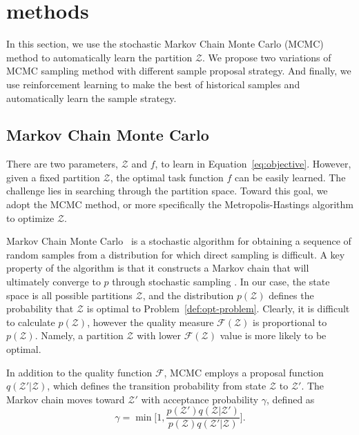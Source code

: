 \section{methods}
\label{sec:method}

In this section, we use the stochastic Markov Chain Monte Carlo (MCMC) method to automatically learn the partition $\mathcal{Z}$. We propose two variations of MCMC sampling method with different sample proposal strategy. And finally, we use reinforcement learning to make the best of historical samples and automatically learn the sample strategy.


\subsection{Markov Chain Monte Carlo}

There are two parameters, $\mathcal{Z}$ and $f$, to learn in Equation~\ref{eq:objective}. However, given a fixed partition $\mathcal{Z}$, the optimal task function $f$ can be easily learned. The challenge lies in searching through the partition space. Toward this goal, we adopt the MCMC method, or more specifically the Metropolis-Hastings algorithm to optimize $\mathcal{Z}$. 

Markov Chain Monte Carlo~\cite{andrieu2003introduction} is a stochastic algorithm for obtaining a sequence of random samples from a distribution for which direct sampling is difficult. A key property of the algorithm is that it constructs a Markov chain that will ultimately converge to $p$ through stochastic sampling \cite{ml:murphy}. In our case, the state space is all possible partitions $\mathcal{Z}$, and the distribution $p(\mathcal{Z})$ defines the probability that $\mathcal{Z}$ is optimal to Problem~\ref{def:opt-problem}. Clearly, it is difficult to calculate $p(\mathcal{Z})$, however the quality measure $\mathcal{F}(\mathcal{Z})$ is proportional to $p(\mathcal{Z})$. Namely, a partition $\mathcal{Z}$ with lower $\mathcal{F}(\mathcal{Z})$ value is more likely to be optimal.


In addition to the quality function $\mathcal{F}$, MCMC employs a proposal function $q(\mathcal{Z}'|\mathcal{Z})$, which defines the transition probability from state $\mathcal{Z}$ to $\mathcal{Z}'$. The Markov chain moves toward $\mathcal{Z}'$ with acceptance probability $\gamma$, defined as
\begin{equation}
\gamma = \min \Big [ 1, \frac{p(\mathcal{Z}')q(\mathcal{Z}| \mathcal{Z}')}{p(\mathcal{Z})q(\mathcal{Z}'|\mathcal{Z})} \Big ].
\label{eq:gamma}
\end{equation}

